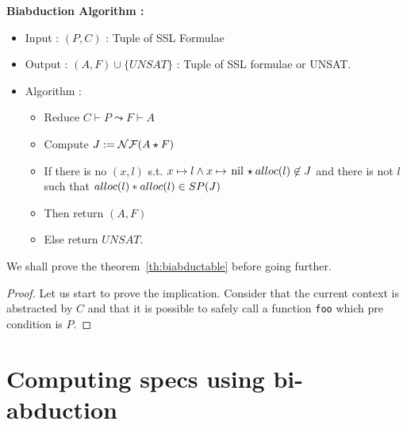 \textbf{Biabduction Algorithm :}
\begin{itemize}
\item Input : $(P,C)$ : Tuple of SSL Formulae
\item Output : $(A,F) \cup \lbrace UNSAT\rbrace$ : Tuple of SSL formulae or UNSAT.
\item Algorithm :
\begin{itemize}

\item Reduce $C\vdash P \leadsto F\vdash A$
\item Compute $J:=\mathcal{NF}(A \star F)$
\item If  there is no $(x,l)$ s.t. $\Sepf{\Pointsto{x}{l} \wedge \Pointstonil{x}}{\Alloc{l}}\not\in J$
and there is not $l$ such that $alloc(l) \ast alloc(l)\in SP(J)$
\item Then return $(A,F)$
\item Else return $UNSAT$.
\end{itemize}
\end{itemize}

We shall prove the theorem~\ref{th:biabductable} before going further. 

\begin{proof}
Let us start to prove the implication. Consider that the current context is
abstracted by $C$ and that it is possible to safely call a function \lstinline!foo!
which pre condition is $P$. 


\end{proof}

\section{Computing specs using bi-abduction}
